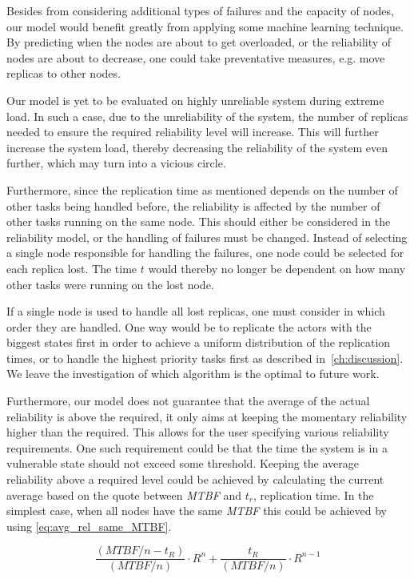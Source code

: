 \documentclass{cslthse-msc}
\begin{document}
Besides from considering additional types of failures and the capacity of nodes, our model would benefit greatly from applying some machine learning technique. By predicting when the nodes are about to get overloaded, or the reliability of nodes are about to decrease, one could take preventative measures, e.g. move replicas to other nodes.

Our model is yet to be evaluated on highly unreliable system during extreme load. In such a case, due to the unreliability of the system, the number of replicas needed to ensure the required reliability level will increase. This will further increase the system load, thereby decreasing the reliability of the system even further, which may turn into a vicious circle.

Furthermore, since the replication time as mentioned depends on the number of other tasks being handled before, the reliability is affected by the number of other tasks running on the same node. This should either be considered in the reliability model, or the handling of failures must be changed. Instead of selecting a single node responsible for handling the failures, one node could be selected for each replica lost. The time $t$ would thereby no longer be dependent on how many other tasks were running on the lost node.

If a single node is used to handle all lost replicas, one must consider in which order they are handled. One way would be to replicate the actors with the biggest states first in order to achieve a uniform distribution of the replication times, or to handle the highest priority tasks first as described in~\cref{ch:discussion}. We leave the investigation of which algorithm is the optimal to future work. 

Furthermore, our model does not guarantee that the average of the actual reliability is above the required, it only aims at keeping the momentary reliability higher than the required. This allows for the user specifying various reliability requirements. One such requirement could be that the time the system is in a vulnerable state should not exceed some threshold. Keeping the average reliability above a required level could be achieved by calculating the current average based on the quote between \emph{MTBF} and $t_r$, replication time. In the simplest case, when all nodes have the same \emph{MTBF} this could be achieved by using \cref{eq:avg_rel_same_MTBF}.

\begin{equation} \label{eq:avg_rel_same_MTBF}
	\frac{(MTBF/n - t_{R})}{(MTBF/n)} \cdot R^n + \frac{t_{R}}{(MTBF/n)} \cdot R^{n-1}
\end{equation}
\end{document}
